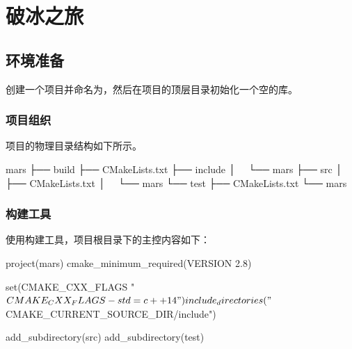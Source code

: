 \section{破冰之旅}

\begin{content}

\subsection{环境准备}

创建一个项目并命名为，然后在项目的顶层目录初始化一个空的库。

\begin{leftbar}
\end{leftbar}  

\subsubsection{项目组织}

项目的物理目录结构如下所示。

\begin{leftbar}
 \begin{c++}[caption={\ttfamily{项目组织}}]
mars
├── build
├── CMakeLists.txt
├── include
│   └── mars
├── src
│   ├── CMakeLists.txt
│   └── mars
└── test
    ├── CMakeLists.txt
    └── mars
 \end{c++}
\end{leftbar}

\subsubsection{构建工具}

使用构建工具，项目根目录下的主控内容如下：

\begin{leftbar}
 \begin{c++}[caption={\ttfamily{CMakeLists.txt}}]
project(mars)                                                                                  
cmake_minimum_required(VERSION 2.8)

set(CMAKE_CXX_FLAGS "${CMAKE_CXX_FLAGS} -std=c++14")

include_directories("${CMAKE_CURRENT_SOURCE_DIR}/include")

add_subdirectory(src)
add_subdirectory(test)
 \end{c++}
\end{leftbar}


\end{content}
